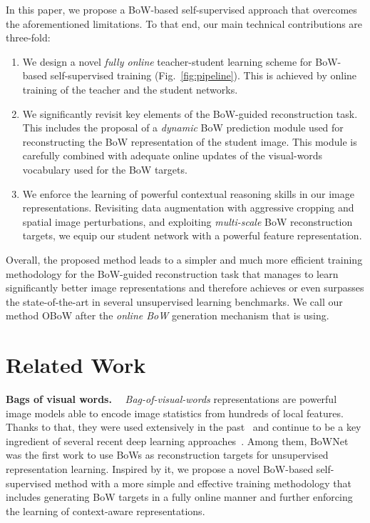 \documentclass[final]{cvpr}
\newcommand{\paragnoskip}[1]{\noindent\textbf{#1}~~}
\begin{document}
In this paper, we propose a BoW-based self-supervised approach that overcomes the aforementioned limitations. 
To that end, our main technical contributions are three-fold:
\begin{enumerate} \item 
    We design a novel \emph{fully online} teacher-student learning scheme for BoW-based self-supervised training (Fig.~\ref{fig:pipeline}). 
    This is achieved by online training of the teacher and the student networks. 
    \item We significantly revisit key elements of the BoW-guided reconstruction task.
    This includes the proposal of a \emph{dynamic} BoW prediction module used for reconstructing the BoW representation of the student image. This module is carefully combined with adequate online updates of the visual-words vocabulary used for the BoW targets.
    \item We enforce the learning of powerful contextual reasoning skills in our image representations. Revisiting data augmentation with aggressive cropping and spatial image perturbations, and exploiting \emph{multi-scale} BoW reconstruction targets, we equip our student network with a powerful feature representation. 
\end{enumerate}
Overall, the proposed method leads to a simpler and much more efficient training methodology for the BoW-guided reconstruction task that manages to learn significantly better image representations and therefore achieves or even surpasses the state-of-the-art in several unsupervised learning benchmarks.
We call our method OBoW after the \textit{online BoW} generation mechanism that is using. \section{Related Work}

\paragnoskip{Bags of visual words.}
\emph{Bag-of-visual-words} representations are powerful image models able to encode image statistics from hundreds of local features.
Thanks to that, they were used extensively in the past~\cite{csurka2004visual,jegou2010aggregating,perronnin2007fisher,sivic2006video,tolias2013aggregate} and continue to be a key ingredient of several recent deep learning approaches~\cite{arandjelovic2016netvlad,gidaris2020learning,girdhar2017actionvlad,jain2020quest}.
Among them, BoWNet~\cite{gidaris2020learning} was the first work to use BoWs as reconstruction targets for unsupervised representation learning. 
Inspired by it, we propose a novel BoW-based self-supervised method with a more simple and effective training methodology that includes generating BoW targets in a fully online manner and further enforcing the learning of context-aware representations. 
\end{document}

